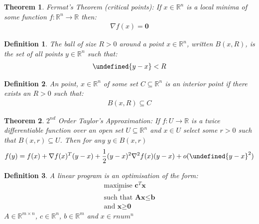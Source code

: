 \documentclass[a4paper,10pt]{article}
\let\norm\undefined %
\DeclarePairedDelimiter\norm{\lVert}{\rVert}
\def\rnum{\mathbb{R}}
\newtheorem*{definition}{Definition}
\newtheorem*{theorem}{Theorem}
\begin{document}
\begin{theorem}
    Fermat's Theorem (critical points): If $x \in \rnum^{n}$ is a local minima of some function $f : \rnum^{n} \rightarrow \rnum$ then:
    \begin{align*}
        \nabla f(x) = \textbf{0}
    \end{align*}
    \label{<+label+>}
\end{theorem}


\begin{definition}
    The ball of size $R > 0$ around a point $x \in \rnum^{n}$, written $B(x, R)$, is the set of all points $y \in \rnum^{n}$ such that:
    \begin{align*}
        \norm{y - x} < R
    \end{align*}
    \label{j}
\end{definition}

\begin{definition}
    An point, $x \in \rnum^{n}$ of some set $C \subseteq \rnum^{n}$ is an interior point if there exists an $R > 0 $ such that:
    \begin{align*}
        B(x, R) \subseteq C
    \end{align*}
    \label{<+label+>}
\end{definition}

\begin{theorem}
    $2^{nd}$ Order Taylor's Approximation: If $f : U \rightarrow \rnum$ is a
    twice differentiable function over an open set $U \subseteq \rnum^{n}$ and
    $x \in U$ select some $r > 0$ such that $B(x, r) \subseteq U$. Then for any
    $y \in B(x,r)$
    \begin{align*}
        f(y) = f(x) + \nabla f(x)^{T}(y-x) + \frac{1}{2}(y-x)^{2}\nabla^{2}f(x)(y-x) + o(\norm{y-x}^{2})
    \end{align*}
    \label{k}
\end{theorem}


\begin{definition}
    A linear program is an optimisation of the form:
    \begin{align*}
        \underset{x}{\text{maximise }} \textbf{c}^{T}\textbf{x} \\
        \text{such that } \textbf{A}\textbf{x} \leq \textbf{b} \\
        \text{and } \textbf{x} \geq \textbf{0}
    \end{align*}
    $A \in \rnum^{m \times n}$, $c \in \rnum^{n}$, $b \in \rnum^{m}$ and $x \in rnum^{n}$
    \label{t}
\end{definition}
\end{document}
